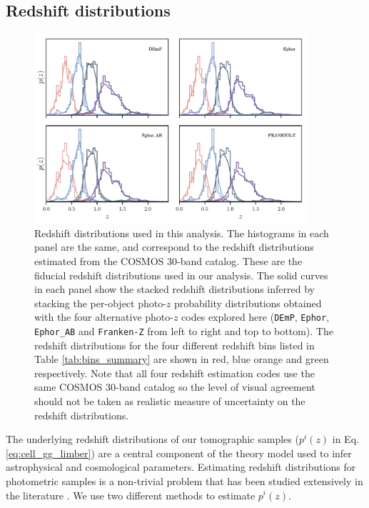 \documentclass[a4paper,11pt]{article}
\begin{document}
  \subsection{Redshift distributions}\label{ssec:methods.nz}
    \begin{figure}
      \centering
      \includegraphics[width=0.9\textwidth]{figures/nzs.pdf}
      \caption{Redshift distributions used in this analysis. The histograms in each panel are the same, and correspond to the redshift distributions estimated from the COSMOS 30-band catalog. These are the fiducial redshift distributions used in our analysis. The solid curves in each panel show the stacked redshift distributions inferred by stacking the per-object photo-$z$ probability distributions obtained with the four alternative photo-$z$ codes explored here ({\tt DEmP}, {\tt Ephor}, {\tt Ephor\_AB} and {\tt Franken-Z} from left to right and top to bottom). The redshift distributions for the four different redshift bins listed in Table \ref{tab:bins_summary} are shown in red, blue orange and green respectively. Note that all four redshift estimation codes use the same COSMOS 30-band catalog so the level of visual agreement should not be taken as realistic measure of uncertainty on the redshift distributions.}
      \label{fig:nzs}
    \end{figure}
    The underlying redshift distributions of our tomographic samples ($p^i(z)$ in Eq. \ref{eq:cell_gg_limber}) are a central component of the theory model used to infer astrophysical and cosmological parameters. Estimating redshift distributions for photometric samples is a non-trivial problem that has been studied extensively in the literature \citep{2008MNRAS.390..118L,2008ApJ...684...88N,2018MNRAS.478..592H}. We use two different methods to estimate $p^i(z)$.
    
\end{document}
